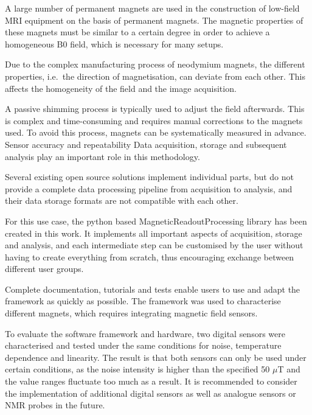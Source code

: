 A large number of permanent magnets are used in the construction of
low-field MRI equipment on the basis of permanent magnets. The magnetic
properties of these magnets must be similar to a certain degree in order
to achieve a homogeneous B0 field, which is necessary for many setups.

Due to the complex manufacturing process of neodymium magnets, the
different properties, i.e.~the direction of magnetisation, can deviate
from each other. This affects the homogeneity of the field and the image
acquisition.

A passive shimming process is typically used to adjust the field
afterwards. This is complex and time-consuming and requires manual
corrections to the magnets used. To avoid this process, magnets can be
systematically measured in advance. Sensor accuracy and repeatability
Data acquisition, storage and subsequent analysis play an important role
in this methodology.

Several existing open source solutions implement individual parts, but
do not provide a complete data processing pipeline from acquisition to
analysis, and their data storage formats are not compatible with each
other.

For this use case, the python based MagneticReadoutProcessing library
has been created in this work. It implements all important aspects of
acquisition, storage and analysis, and each intermediate step can be
customised by the user without having to create everything from scratch,
thus encouraging exchange between different user groups.

Complete documentation, tutorials and tests enable users to use and
adapt the framework as quickly as possible. The framework was used to
characterise different magnets, which requires integrating magnetic
field sensors.

To evaluate the software framework and hardware, two digital sensors
were characterised and tested under the same conditions for noise,
temperature dependence and linearity. The result is that both sensors
can only be used under certain conditions, as the noise intensity is
higher than the specified 50 \(\mu\)T and the value ranges fluctuate too
much as a result. It is recommended to consider the implementation of
additional digital sensors as well as analogue sensors or NMR probes in
the future.
